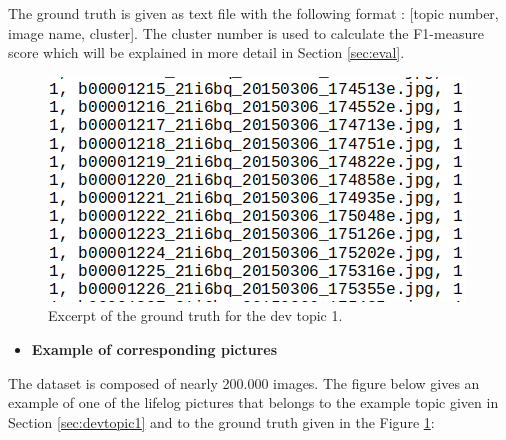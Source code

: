     The ground truth is given as text file with the following format : [topic number, image name, cluster].
    The cluster number is used to calculate the F1-measure score which will be explained in more detail in Section \ref{sec:eval}.


    \begin{figure}[htb]
        
        \centering
        \captionsetup{justification=centering}
        \includegraphics[scale = 0.55]{Sections/5ImageClef/images/gt_t1.png}
        \caption[Ground truth excerpt]{Excerpt of the ground truth for the dev topic 1.}  
        \label{fig:gt}
    \end{figure}

    \begin{itemize}
        \item    \textbf{Example of corresponding pictures}
    \end{itemize}
 

    The dataset is composed of nearly 200.000 images. The figure below gives an example of one of the lifelog pictures that belongs to the example topic given in Section \ref{sec:devtopic1} and to the ground truth given in the Figure \ref{fig:gt}:


